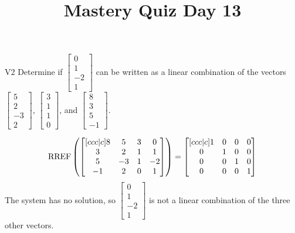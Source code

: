 \documentclass{sbgLAquiz}
\title{Mastery Quiz Day 13 }
\begin{document}
\begin{problem}{V2}
Determine if $\begin{bmatrix} 0 \\ 1 \\ -2 \\ 1 \end{bmatrix}$ can be written as a linear combination of the vectors $\begin{bmatrix} 5 \\ 2 \\ -3 \\ 2 \end{bmatrix}$, $\begin{bmatrix} 3 \\ 1 \\ 1 \\ 0 \end{bmatrix}$, and $\begin{bmatrix} 8 \\ 3 \\ 5 \\ -1 \end{bmatrix}$.
\end{problem}
\begin{solution}

$$\operatorname{RREF} \left(\begin{bmatrix}[ccc|c] 8 & 5 & 3 & 0\\ 3 & 2 & 1 & 1 \\ 5 & -3 & 1 & -2  \\ -1 & 2 & 0 & 1 \end{bmatrix} \right) = \begin{bmatrix}[ccc|c] 1 & 0 & 0 & 0  \\ 0 &  1 & 0 & 0  \\ 0 & 0 & 1 & 0 \\ 0 & 0 & 0 & 1  \end{bmatrix}$$
The system has no solution, so $\begin{bmatrix} 0 \\ 1 \\ -2 \\ 1 \end{bmatrix}$ is not a linear combination of the three other vectors.
\end{solution}
\end{document}
